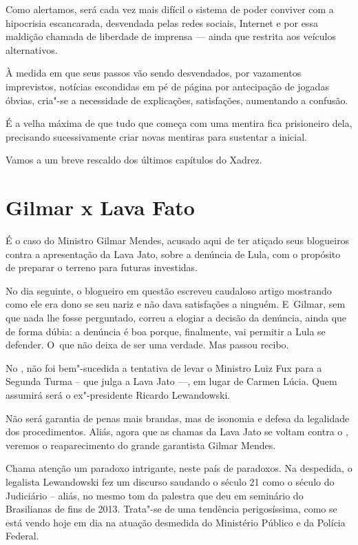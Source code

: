  

Como alertamos, será cada vez mais difícil o sistema de poder conviver
com a hipocrisia escancarada, desvendada pelas redes sociais, Internet e
por essa maldição chamada de liberdade de imprensa --- ainda que
restrita aos veículos alternativos.

À medida em que seus passos vão sendo desvendados, por vazamentos
imprevistos, notícias escondidas em pé de página por antecipação de
jogadas óbvias, cria"-se a necessidade de explicações, satisfações,
aumentando a confusão.

É a velha máxima de que tudo que começa com uma mentira fica prisioneiro
dela, precisando sucessivamente criar novas mentiras para sustentar a
inicial.

Vamos a um breve rescaldo dos últimos capítulos do Xadrez.

\section{Gilmar x Lava Fato}

É o caso do Ministro Gilmar Mendes, acusado aqui de ter atiçado seus
blogueiros contra a apresentação da Lava Jato, sobre a denúncia de Lula,
com o propósito de preparar o terreno para futuras investidas.

No dia seguinte, o blogueiro em questão escreveu caudaloso artigo
mostrando como ele era dono se seu nariz e não dava satisfações a
ninguém. E~Gilmar, sem que nada lhe fosse perguntado, correu a elogiar a
decisão da denúncia, ainda que de forma dúbia: a denúncia é boa porque,
finalmente, vai permitir a Lula se defender. O~que não deixa de ser uma
verdade. Mas passou recibo.

No , não foi bem"-sucedida a tentativa de levar o Ministro Luiz Fux
para a Segunda Turma -- que julga a Lava Jato \mbox{---,} em lugar de Carmen
Lúcia. Quem assumirá será o ex"-presidente Ricardo Lewandowski.

Não será garantia de penas mais brandas, mas de isonomia e defesa da
legalidade dos procedimentos. Aliás, agora que as chamas da Lava Jato se
voltam contra o , veremos o reaparecimento do grande garantista
Gilmar Mendes.

Chama atenção um paradoxo intrigante, neste país de paradoxos. Na
despedida, o legalista Lewandowski fez um discurso saudando o século 21
como o século do Judiciário -- aliás, no mesmo tom da palestra que deu
em seminário do Brasilianas de fins de 2013. Trata"-se de uma tendência
perigosíssima, como se está vendo hoje em dia na atuação desmedida do
Ministério Público e da Polícia Federal.

